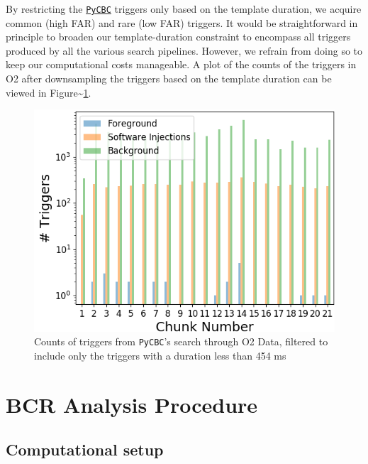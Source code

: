 \documentclass[%
 reprint,
 amsmath,amssymb,
 aps,
]{revtex4-2}
\begin{document}
By restricting the \href{https://pycbc.org/}{\texttt{PyCBC}} triggers only based on the template duration, we acquire common (high FAR) and rare (low
FAR) triggers. It would be straightforward in principle to broaden our template-duration constraint to encompass all
triggers produced by all the various search pipelines. However, we refrain from doing so to keep our computational costs
manageable. A plot of the counts of the triggers in O2 after downsampling the triggers based on the template duration
can be viewed in Figure\textasciitilde\ref{fig:o2FilteredTrigCount}.



\begin{figure}[!h]

{\centering \includegraphics[width=0.75\linewidth]{images/O2_filtered_trigger_counts} 

}

\caption[Count of triggers in PyCBC O2 search shorter than 454 ms]{Counts of triggers from \texttt{PyCBC}'s search through O2 Data, filtered to include only the triggers with a duration less than 454 ms}\label{fig:o2FilteredTrigCount}
\end{figure}

\hypertarget{bcr-analysis-procedure}{%
\section{BCR Analysis Procedure}\label{bcr-analysis-procedure}}

\hypertarget{computational-setup}{%
\subsection{Computational setup}\label{computational-setup}}
\end{document}
